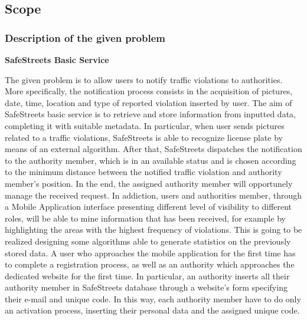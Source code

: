 \documentclass[12pt]{article}
\begin{document}
\subsection{Scope}
\vspace{5mm}
\subsubsection{Description of the given problem}
\vspace{2mm}
	
	\textbf{SafeStreets Basic Service}

\vspace{3mm}
The given problem is to allow users to notify traffic violations to authorities. More specifically, the notification process consists in the acquisition of pictures, date, time, location and type of reported violation inserted by user. The aim of SafeStreets basic service is to retrieve and store information from inputted data, completing it with suitable metadata.  In particular, when user sends pictures related to a traffic violations, SafeStreets is able to recognize license plate by means of an external algorithm. After that, SafeStreets dispatches the notification to the authority member, which is in an available status and is chosen according to the minimum distance between the notified traffic violation and authority member’s position. In the end, the assigned authority member will opportunely manage the received request. In addiction, users and authorities member, through a Mobile Application interface presenting different level of visibility to different roles, will be able to mine information that has been received, for example by highlighting the areas with the highest frequency of violations. This is going to be realized designing some algorithms able to generate statistics on the previously stored data. A user who approaches the mobile application for the first time has to complete a registration process, as well as an authority which approaches the dedicated website for the first time. In particular, an authority inserts all their authority member in SafeStreets database through a website’s form specifying their e-mail and unique code. In this way, each authority member have to do only an activation process, inserting their personal data and the assigned unique code.

\vspace{5mm}
\end{document}
